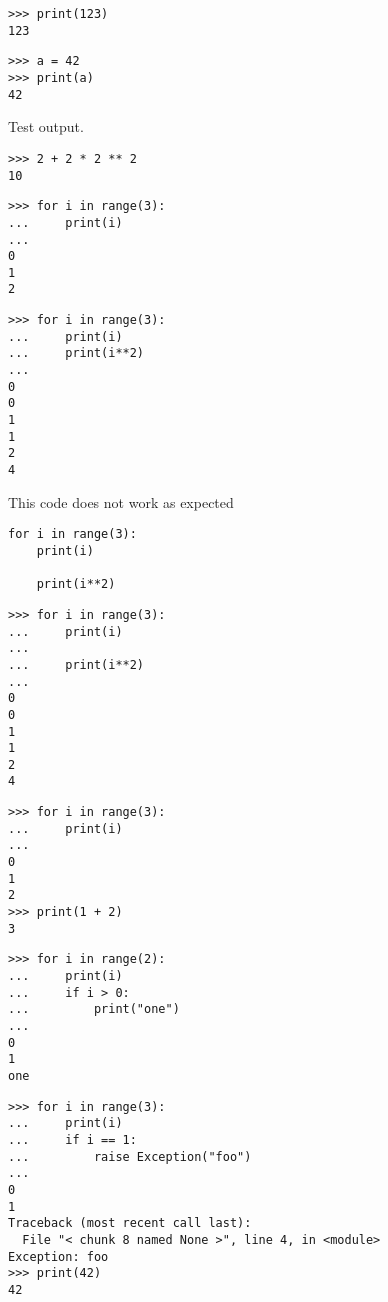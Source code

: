 
\begin{verbatim}
>>> print(123)
123

\end{verbatim}


\begin{verbatim}
>>> a = 42
>>> print(a)
42

\end{verbatim}

Test output.

\begin{verbatim}
>>> 2 + 2 * 2 ** 2
10

\end{verbatim}


\begin{verbatim}
>>> for i in range(3):
...     print(i)
...
0
1
2

\end{verbatim}


\begin{verbatim}
>>> for i in range(3):
...     print(i)
...     print(i**2)
...
0
0
1
1
2
4

\end{verbatim}

This code does not work as expected
\begin{verbatim}
for i in range(3):
    print(i)

    print(i**2)
\end{verbatim}


\begin{verbatim}
>>> for i in range(3):
...     print(i)
...
...     print(i**2)
...
0
0
1
1
2
4

\end{verbatim}


\begin{verbatim}
>>> for i in range(3):
...     print(i)
...
0
1
2
>>> print(1 + 2)
3

\end{verbatim}


\begin{verbatim}
>>> for i in range(2):
...     print(i)
...     if i > 0:
...         print("one")
...
0
1
one

\end{verbatim}


\begin{verbatim}
>>> for i in range(3):
...     print(i)
...     if i == 1:
...         raise Exception("foo")
...
0
1
Traceback (most recent call last):
  File "< chunk 8 named None >", line 4, in <module>
Exception: foo
>>> print(42)
42

\end{verbatim}


